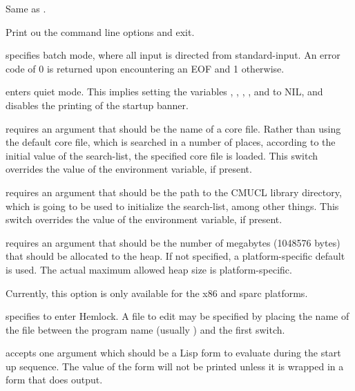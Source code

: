 \begin{Lentry}
\item[\code{--help}] Same as .

\item[\code{-help}] Print ou the command line options and exit.
  
\item[\code{-batch}] specifies batch mode, where all input is
  directed from standard-input.  An error code of 0 is returned upon
  encountering an EOF and 1 otherwise.

\item[\code{-quiet}] enters quiet mode. This implies setting the
  variables , ,
  , ,
   and  to NIL, and
  disables the printing of the startup banner.

\item[\code{-core}] requires an argument that should be the name of a
  core file.  Rather than using the default core file, which is searched
  in a number of places, according to the initial value of the
   search-list, the specified core file is loaded.  This
  switch overrides the value of the  environment variable,
  if present.
  
\item[\code{-lib}] requires an argument that should be the path to the
  CMUCL library directory, which is going to be used to initialize the
   search-list, among other things.  This switch overrides
  the value of the  environment variable, if present.

\item[\code{-dynamic-space-size}] requires an argument that should be
  the number of megabytes (1048576 bytes) that should be allocated to
  the heap.  If not specified, a platform-specific default is used.
  The actual maximum allowed heap size is platform-specific.

  Currently, this option is only available for the x86 and sparc
  platforms. 

\item[\code{-edit}] specifies to enter Hemlock.  A file to edit may be
  specified by placing the name of the file between the program name
  (usually ) and the first switch.
  
\item[\code{-eval}] accepts one argument which should be a Lisp form
  to evaluate during the start up sequence.  The value of the form
  will not be printed unless it is wrapped in a form that does output.
  

\end{Lentry}
